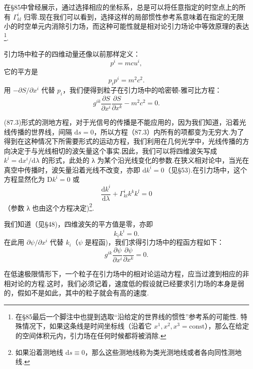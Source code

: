 在§85中曾经展示，通过选择相应的坐标系，总是可以将任意指定的时空点上的所有 $\Gamma^i_{kl}$ 归零.现在我们可以看到，选择这样的局部惯性参考系意味着在指定的无限小的时空单元内消除引力场，而这种可能性就是相对论引力场论中等效原理的表达\footnote{在§85最后一个脚注中也提到选取“沿给定的世界线的惯性”参考系的可能性. 特殊情况下，如果这条线是时间坐标线（沿着它 $x^1,x^2,x^3=\mathrm{const}$），那么在给定的空间体积元内，引力场在任何时候都将被消除.}.

引力场中粒子的四维动量还像以前那样定义：
\begin{equation}
  p^i=mcu^i,
\end{equation}
它的平方是
\begin{equation}
  p_ip^i=m^2c^2.
\end{equation}
用 $-\partial S/\partial x^i$ 代替 $p_i$，我们便得到粒子在引力场中的哈密顿-雅可比方程：
\begin{equation}
  g^{ik}\frac{\partial S}{\partial x^i}
  \frac{\partial S}{\partial x^k}-m^2c^2=0.
\end{equation}

(87.3)形式的测地方程，对于光信号的传播是不能应用的，因为我们知道，沿着光线传播的世界线，间隔 $\mathrm{d}s=0$，所以方程（87.3）内所有的项都变为无穷大.为了得到在这种情况下所需要形式的运动方程，我们利用在几何光学中，光线传播的方向决定于与光线相切的波矢量这个事实.因此，我们可以将四维波矢写成 $k^i=\mathrm{d}x^i/\mathrm{d}\lambda$ 的形式，此处的 λ 为某个沿光线变化的参数.在狭义相对论中，当光在真空中传播时，波矢量沿着光线不改变，亦即 $\mathrm{d}k^i=0$（见§53).在引力场中，这个方程显然化为 $\mathrm{D}k^i=0$ 或
\begin{equation}
  \frac{\mathrm{d}k^i}{\mathrm{d}\lambda}
  +\Gamma^i_{kl}k^kk^l=0
\end{equation}
（参数 λ 也由这个方程决定)\footnote{如果沿着测地线 $\mathrm{d}s\equiv 0$，那么这些测地线称为类光测地线或者各向同性测地线.}.

我们知道（见§48)，四维波矢的平方值是零，亦即
\begin{equation}
  k_ik^i=0.
\end{equation}
在此用 $\partial\psi/\partial x^i$ 代替 $k_i$（$\psi$ 是程函)，我们求得引力场中的程函方程如下：
\begin{equation}
  g^{ik}\frac{\partial\psi}{\partial x^i}
  \frac{\partial\psi}{\partial x^k}=0.
\end{equation}

在低速极限情形下，一个粒子在引力场中的相对论运动方程，应当过渡到相应的非相对论的方程.这时，我们必须记着，速度低的假设就已经要求引力场的本身是弱的，假如不是如此，其中的粒子就会有高的速度.

